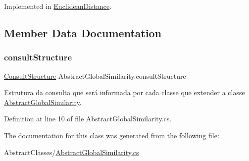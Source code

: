 Implemented in \hyperlink{class_euclidean_distance_a1b27b1fd06df3e3defca37187634951e}{Euclidean\+Distance}.



\subsection{Member Data Documentation}
\hypertarget{class_abstract_global_similarity_a471ea41af416fd702d48f3b143416e66}{}\label{class_abstract_global_similarity_a471ea41af416fd702d48f3b143416e66} 
\subsubsection{\texorpdfstring{consult\+Structure}{consultStructure}}
{\footnotesize\ttfamily \hyperlink{class_consult_structure}{Consult\+Structure} Abstract\+Global\+Similarity.\+consult\+Structure}



Estrutura da consulta que será informada por cada classe que extender a classe \hyperlink{class_abstract_global_similarity}{Abstract\+Global\+Similarity}. 



Definition at line 10 of file Abstract\+Global\+Similarity.\+cs.



The documentation for this class was generated from the following file\+:\begin{DoxyCompactItemize}
\item 
Abstract\+Classes/\hyperlink{_abstract_global_similarity_8cs}{Abstract\+Global\+Similarity.\+cs}\end{DoxyCompactItemize}
